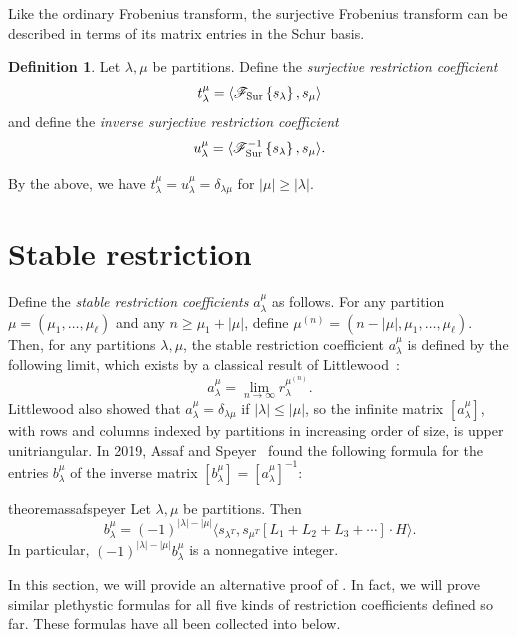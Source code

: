 \documentclass[11pt]{article}
\theoremstyle{definition}
\newtheorem{defi}[theo]{Definition}
\numberwithin{equation}{section}
\newcommand{\Sur}{\mathchoice{\operatorname{Sur}}{\operatorname{Sur}}{\mathrm{Sur}}{\mathrm{Sur}}}
\newcommand{\FSur}[1]{\mathscr{F}_{\Sur}\left\{#1\right\}}
\newcommand{\FSurInv}[1]{\mathscr{F}_{\Sur}^{-1}\left\{#1\right\}}
\begin{document}
Like the ordinary Frobenius transform, the surjective Frobenius transform can be described in terms of its matrix entries in the Schur basis.
\begin{defi}
Let $\lambda, \mu$ be partitions. Define the \emph{surjective restriction coefficient} \[t_\lambda^\mu = \langle \FSur{s_\lambda}, s_\mu\rangle\] and define the \emph{inverse surjective restriction coefficient} \[u_\lambda^\mu = \langle \FSurInv{s_\lambda}, s_\mu\rangle.\]
\end{defi}
By the above, we have $t_\lambda^\mu = u_\lambda^\mu = \delta_{\lambda \mu}$ for $|\mu| \geq |\lambda|$.
\section{Stable restriction}
\label{section:stable}
Define the \emph{stable restriction coefficients} $a_\lambda^\mu$ as follows. For any partition $\mu = (\mu_1, \ldots, \mu_\ell)$ and any $n \geq \mu_1 + |\mu|$, define $\mu^{(n)} = (n - |\mu|, \mu_1, \ldots, \mu_\ell)$. Then, for any partitions $\lambda, \mu$, the stable restriction coefficient $a_\lambda^\mu$ is defined by the following limit, which exists by a classical result of Littlewood~\cite{MR1576896}: \[a_\lambda^\mu = \lim_{n \to \infty} r_{\lambda}^{\mu^{(n)}}.\] Littlewood also showed that $a_{\lambda}^\mu = \delta_{\lambda \mu}$ if $|\lambda| \leq |\mu|$, so the infinite matrix $[a_\lambda^\mu]$, with rows and columns indexed by partitions in increasing order of size, is upper unitriangular. In 2019, Assaf and Speyer~\cite{MR4055931} found the following formula for the entries $b_\lambda^\mu$ of the inverse matrix $[b_\lambda^\mu] = [a_\lambda^\mu]^{-1}$:
\begin{restatable}[{\cite[Theorem~2]{MR4055931}}]{theorem}{assafspeyer}
\label{theorem:assafspeyer}
Let $\lambda, \mu$ be partitions. Then \[b_\lambda^\mu = (-1)^{|\lambda| - |\mu|} \langle s_{\lambda^T}, s_{\mu^T}[L_1 + L_2 + L_3 + \cdots] \cdot H \rangle.\] In particular, $(-1)^{|\lambda| - |\mu|}b_\lambda^\mu$ is a nonnegative integer.
\end{restatable}
In this section, we will provide an alternative proof of . In fact, we will prove similar plethystic formulas for all five kinds of restriction coefficients defined so far. These formulas have all been collected into  below.
\end{document}
